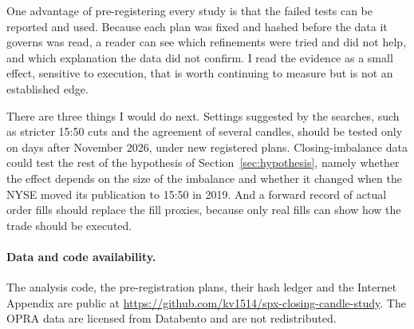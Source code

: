 \documentclass[12pt,letterpaper]{article}
\newif\ifblind
\begin{document}
One advantage of pre-registering every study is that the failed tests can be
reported and used. Because each plan was fixed and hashed before the data it
governs was read, a reader can see which refinements were tried and did not
help, and which explanation the data did not confirm. I read the evidence as a
small effect, sensitive to execution, that is worth continuing to measure but
is not an established edge.

There are three things I would do next. Settings suggested by the searches, such
as stricter 15:50 cuts and the agreement of several candles, should be tested only
on days after November 2026, under new registered plans. Closing-imbalance data
could test the rest of the hypothesis of Section~\ref{sec:hypothesis}, namely
whether the effect depends on the size of the imbalance and whether it changed
when the NYSE moved its publication to 15:50 in 2019. And a forward record of
actual order fills should replace the fill proxies, because only real fills can
show how the trade should be executed.

\paragraph{Data and code availability.} \ifblind The analysis code, the
pre-registration plans and their hash ledger are available on request (the link
is withheld for review). \else The analysis code, the pre-registration plans,
their hash ledger and the Internet Appendix are public at
\url{https://github.com/kv1514/spx-closing-candle-study}. \fi The OPRA data are
licensed from Databento and are not redistributed.
\end{document}
